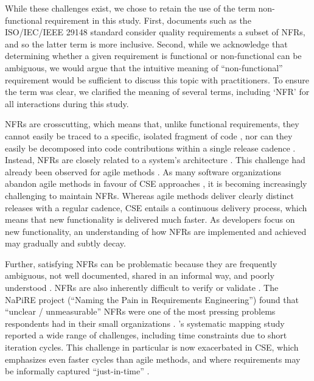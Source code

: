 \documentclass[smallextended]{svjour3}       %
\begin{document}
While these challenges exist, we chose to retain the use of the term non-functional requirement in this study.
First, documents such as the ISO/IEC/IEEE 29148 standard consider quality requirements a subset of NFRs, and so the latter term is more inclusive. Second, while we acknowledge that determining whether a given requirement is functional or non-functional can be ambiguous, we would argue that the intuitive meaning of ``non-functional'' requirement would be sufficient to discuss this topic with practitioners. To ensure the term was clear, we clarified the meaning of several terms, including `NFR' for all interactions during this study. 




NFRs are crosscutting, which means that, unlike functional requirements, they cannot easily be traced to a specific, isolated fragment of code \citep{bellomo_evolutionary_2014,glinz_non-functional_2007}, nor can they easily be decomposed into code contributions within a single release cadence \citep{bellomo_evolutionary_2014}. Instead, NFRs are closely related to a system's architecture \citep{harrison2007leveraging,garlan1995software}. 
This challenge had already been observed for agile methods \citep{nasir2023exploratory,rahy2022managing,behutiye2020management}.
As many software organizations abandon agile methods in favour of CSE approaches \citep{bosch2014continuous, fitzgerald2017continuous, olsson2014towards}, it is becoming increasingly challenging to maintain NFRs. Whereas agile methods deliver clearly distinct releases with a regular cadence, CSE entails a continuous delivery process, which means that new functionality is delivered much faster. As developers focus on new functionality, an understanding of how NFRs are implemented and achieved may gradually and subtly decay. 

Further, satisfying NFRs can be problematic because they are frequently ambiguous, not well documented, shared in an informal way, and poorly understood \citep{chung2012non, ameller_how_2012,ameller2012non}. NFRs are also inherently difficult to verify or validate \citep{borg2003bad, jiang_co-evolution_2015}.
The NaPiRE project (``Naming the Pain in Requirements Engineering'') \citep{Fernandez2018,wagner2019status} 
found that ``unclear / unmeasurable'' NFRs were one of the most pressing problems respondents had in their small organizations \citep{mendez2017naming}. 
\cite{behutiye2020management}'s systematic mapping study reported 
a wide range of challenges, including time constraints due to short iteration cycles. 
This challenge in particular is now exacerbated in CSE, which emphasizes even faster cycles than agile methods, and where requirements may be informally captured ``just-in-time'' \citep{ernst_case_2012}.
\end{document}
